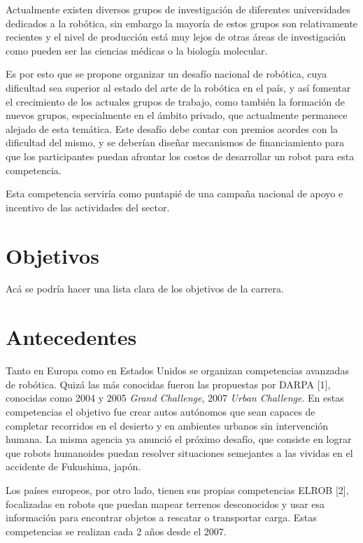 \documentclass[a4paper,12pt]{article}
\begin{document}
Actualmente existen diversos grupos de investigación de diferentes universidades dedicados a la robótica, sin embargo la mayoría de estos grupos son relativamente recientes y el nivel de producción está muy lejos de otras áreas de investigación como pueden ser las ciencias médicas o la biología molecular.

Es por esto que se propone organizar un desafío nacional de robótica, cuya dificultad sea superior al estado del arte de la robótica en el país, y así fomentar el crecimiento de los actuales grupos de trabajo, como también la formación de nuevos grupos, especialmente en el ámbito privado, que actualmente permanece alejado de esta temática. Este desafío debe contar con premios acordes con la dificultad del mismo, y se deberían diseñar mecanismos de financiamiento para que los participantes puedan afrontar los costos de desarrollar un robot para esta competencia.

Esta competencia serviría como puntapié de una campaña nacional de apoyo e incentivo de las actividades del sector.

\section{Objetivos}

Acá se podría hacer una lista clara de los objetivos de la carrera.

\section{Antecedentes}

Tanto en Europa como en Estados Unidos se organizan competencias avanzadas de robótica. Quizá las más conocidas fueron las propuestas por DARPA [1], conocidas como 2004 y 2005 \textit{Grand Challenge}, 2007 \textit{Urban Challenge}. En estas competencias el objetivo fue crear autos autónomos que sean capaces de completar recorridos en el desierto y en ambientes urbanos sin intervención humana. La misma agencia ya anunció el próximo desafío, que consiste en lograr que robots humanoides puedan resolver situaciones semejantes a las vividas en el accidente de Fukushima, japón.

Los países europeos, por otro lado, tienen sus propias competencias ELROB [2], focalizadas en robots que puedan mapear terrenos desconocidos y usar esa información para encontrar objetos a rescatar o transportar carga. Estas competencias se realizan cada 2 años desde el 2007.
\end{document}
